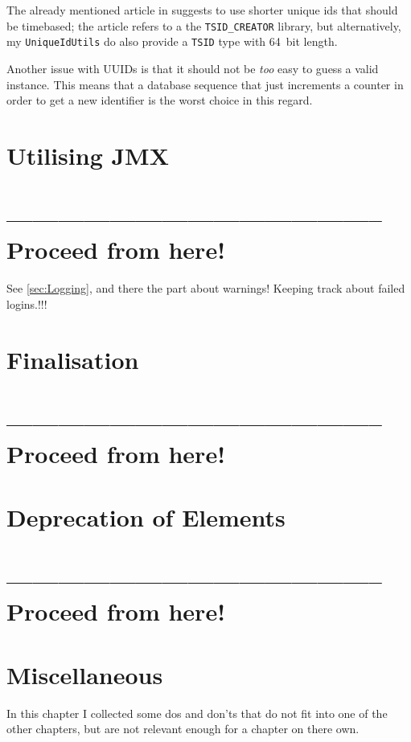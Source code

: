 \documentclass[11pt,a4paper, titlepage, parskip=half, headsepline, footsepline, cleardoublepage=current, headheight=1cm]{scrbook}
\begin{document}
The already mentioned article in \autocite{Mihalcea:UUID_Database_Primary_Key} suggests to use shorter unique ids that should be timebased; the article refers to a the \verb#TSID_CREATOR# library\autocite{Lima:TSID_CREATOR}, but alternatively, my \lstinline|UniqueIdUtils| do also provide a \lstinline|TSID| type with 64~bit length.

Another issue with UUIDs is that it should not be \textit{too} easy to guess a valid instance. This means that a database sequence\autocite{TOAD_WORLD_BLOG:DatabaseSequence} that just increments a counter in order to get a new identifier is the worst choice in this regard.

\section{Utilising JMX}\label{sec:UtilisingJMX}
\section{-------------------------------------------- Proceed from here!}
See \ref{sec:Logging}, and there the part about warnings! Keeping track about failed logins.!!!
\lipsum[1]


\section{Finalisation}\label{sec:Finalisation}
\section{-------------------------------------------- Proceed from here!}
\lipsum[1]

\section{Deprecation of Elements}\label{sec:DeprecationOfElements}
\section{-------------------------------------------- Proceed from here!}
\lipsum[1]

\section{Miscellaneous}
In this chapter I collected some dos and don'ts that do not fit into one of the other chapters, but are not relevant enough for a chapter on there own.
\end{document}
